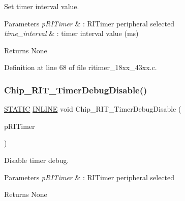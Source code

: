 Set timer interval value. 


\begin{DoxyParams}{Parameters}
{\em p\+R\+I\+Timer} & \+: R\+I\+Timer peripheral selected \\
\hline
{\em time\+\_\+interval} & \+: timer interval value (ms) \\
\hline
\end{DoxyParams}
\begin{DoxyReturn}{Returns}
None 
\end{DoxyReturn}


Definition at line 68 of file ritimer\+\_\+18xx\+\_\+43xx.\+c.

\mbox{\label{group___r_i_t_i_m_e_r__18_x_x__43_x_x_ga947baa4953f68d0de72b1df7dcd9d584}} 
\subsubsection{\texorpdfstring{Chip\+\_\+\+R\+I\+T\+\_\+\+Timer\+Debug\+Disable()}{Chip\_RIT\_TimerDebugDisable()}}
{\footnotesize\ttfamily \hyperlink{group___l_p_c___types___public___macros_ga10b2d890d871e1489bb02b7e70d9bdfb}{S\+T\+A\+T\+IC} \hyperlink{spifi__18xx__43xx_8h_a2eb6f9e0395b47b8d5e3eeae4fe0c116}{I\+N\+L\+I\+NE} void Chip\+\_\+\+R\+I\+T\+\_\+\+Timer\+Debug\+Disable (\begin{DoxyParamCaption}\item[{\hyperlink{struct_l_p_c___r_i_t_i_m_e_r___t}{L\+P\+C\+\_\+\+R\+I\+T\+I\+M\+E\+R\+\_\+T} $\ast$}]{p\+R\+I\+Timer }\end{DoxyParamCaption})}



Disable timer debug. 


\begin{DoxyParams}{Parameters}
{\em p\+R\+I\+Timer} & \+: R\+I\+Timer peripheral selected \\
\hline
\end{DoxyParams}
\begin{DoxyReturn}{Returns}
None 
\end{DoxyReturn}



